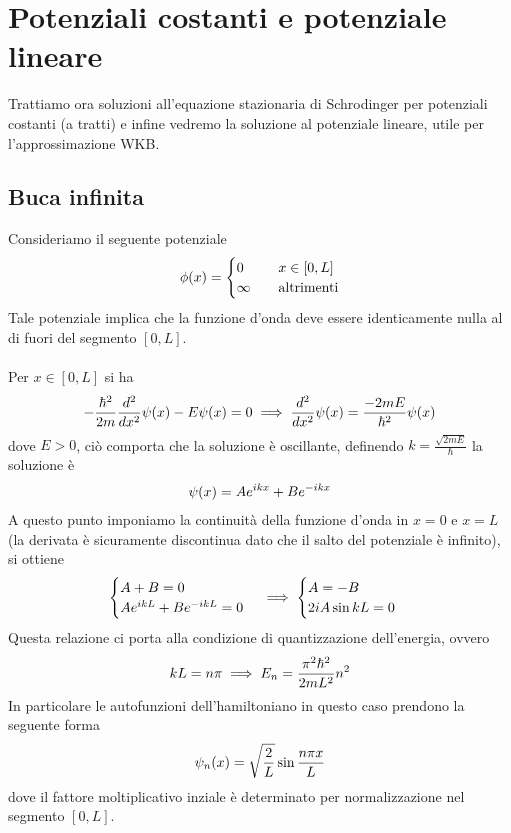 \documentclass{article}
\begin{document}
\newpage
\section{Potenziali costanti e potenziale lineare}
Trattiamo ora soluzioni all'equazione stazionaria di Schrodinger per potenziali costanti (a tratti) e infine vedremo la soluzione al potenziale lineare, utile per l'approssimazione WKB.

\subsection{Buca infinita}
Consideriamo il seguente potenziale
\begin{gather}
    \phi(x) = \begin{cases}
        0 \quad &x \in [0, L] \\
        \infty \quad &\text{altrimenti}
    \end{cases} \notag
\end{gather}
Tale potenziale implica che la funzione d'onda deve essere identicamente nulla al di fuori del segmento $[0, L]$. \\ \\
Per $x \in [0, L]$ si ha
\begin{gather}
    -\frac{\hbar^2}{2m}\frac{d^2}{dx^2}\psi(x) - E\psi(x) = 0 \implies \frac{d^2}{dx^2}\psi(x) = \frac{-2mE}{\hbar^2}\psi(x) \notag
\end{gather}
dove $E > 0$, ciò comporta che la soluzione è oscillante, definendo $k = \frac{\sqrt{2mE}}{\hbar}$ la soluzione è
\begin{gather}
    \psi(x) = Ae^{ikx} + Be^{-ikx} \notag
\end{gather}
A questo punto imponiamo la continuità della funzione d'onda in $x = 0$ e $x = L$ (la derivata è sicuramente discontinua dato che il salto del potenziale è infinito), si ottiene
\begin{gather}
    \begin{cases}
        A + B = 0 \\
        Ae^{ikL} + Be^{-ikL} = 0
    \end{cases} \implies
    \begin{cases}
        A = -B \\
        2iA\sin kL = 0 \notag
    \end{cases}
\end{gather}
Questa relazione ci porta alla condizione di quantizzazione dell'energia, ovvero
\begin{gather}
    kL = n\pi \implies E_n = \frac{\pi^2\hbar^2}{2m L^2}n^2 \notag
\end{gather}
In particolare le autofunzioni dell'hamiltoniano in questo caso prendono la seguente forma
\begin{gather}
    \psi_n(x) = \sqrt{\frac{2}{L}}\sin \frac{n\pi x}{L} \notag
\end{gather}
dove il fattore moltiplicativo inziale è determinato per normalizzazione nel segmento $[0, L]$. 
\end{document}
